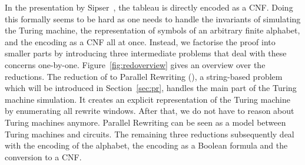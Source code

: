 In the presentation by Sipser~\cite{Sipser:TheoryofComputation}, the tableau is directly encoded as a CNF\@. Doing this formally seems to be hard as one needs to handle the invariants of simulating the Turing machine, the representation of symbols of an arbitrary finite alphabet, and the encoding as a CNF all at once. 
Instead, we factorise the proof into smaller parts by introducing three intermediate problems that deal with these concerns one-by-one. 
Figure~\ref{fig:redoverview} gives an overview over the reductions.
The reduction of \gennp{} to Parallel Rewriting (\PR{}), a string-based problem which will be introduced in Section~\ref{sec:pr}, handles the main part of the Turing machine simulation. 
It creates an explicit representation of the Turing machine by enumerating all rewrite windows. After that, we do not have to reason about Turing machines anymore. 
Parallel Rewriting can be seen as a model between Turing machines and circuits.
The remaining three reductions subsequently deal with the encoding of the alphabet, the encoding as a Boolean formula and the conversion to a CNF\@.

